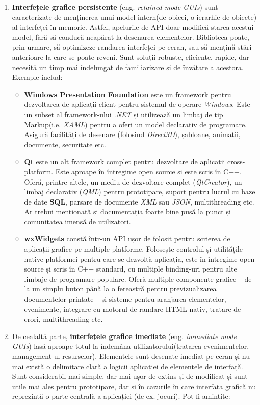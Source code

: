 \documentclass[12pt,a4paper]{report}
\begin{document}
\begin{enumerate}
	\item \textbf{Interfețele grafice persistente} (eng. \textit{retained mode GUIs}) sunt caracterizate de menținerea unui model intern(de obicei, o ierarhie de obiecte) al interfeței în memorie. Astfel, apelurile de API doar modifică starea acestui model, fără să conducă neapărat la desenarea elementelor. Biblioteca poate, prin urmare, să optimizeze randarea interfeței pe ecran, sau să mențină stări anterioare la care se poate reveni. Sunt soluții robuste, eficiente, rapide, dar necesită un timp mai îndelungat de familiarizare și de învățare a acestora. Exemple includ:
	\begin{itemize}
		\item \textbf{Windows Presentation Foundation}\cite{wpf} este un framework pentru dezvoltarea de aplicații client pentru sistemul de operare \textit{Windows}. Este un subset al framework-ului \textit{.NET} și utilizează un limbaj de tip Markup(i.e. \textit{XAML}) pentru a oferi un model declarativ de programare. Asigură facilități de desenare (folosind \textit{Direct3D}), șabloane, animații, documente, securitate etc.
		\item \textbf{Qt}\cite{qt} este un alt framework complet pentru dezvoltare de aplicații cross-platform. Este aproape în întregime open source și este scris în C++. Oferă, printre altele, un mediu de dezvoltare complet (\textit{QtCreator}), un limbaj declarativ (\textit{QML}) pentru prototipare, suport pentru lucrul cu baze de date \textbf{SQL}, parsare de documente \textit{XML} sau \textit{JSON}, multithreading etc. Ar trebui menționată și documentația foarte bine pusă la punct și comunitatea imensă de utilizatori.
		\item \textbf{wxWidgets}\cite{wxwidgets} constă într-un API ușor de folosit pentru scrierea de aplicații grafice pe multiple platforme. Folosește controlul și utilitățile native platformei pentru care se dezvoltă aplicația, este în întregime open source și scris în C++ standard, cu multiple binding-uri pentru alte limbaje de programare populare. Oferă multiple componente grafice -- de la un simplu buton până la o fereastră pentru previzualizarea documentelor printate -- și sisteme pentru aranjarea elementelor, evenimente, integrare cu motorul de randare HTML nativ, tratare de erori, multithreading etc.
	\end{itemize} 
	\item De cealaltă parte, \textbf{interfețele grafice imediate} (eng. \textit{immediate mode GUIs}) lasă aproape totul la îndemâna utilizatorului(tratarea evenimentelor, management-ul resurselor). Elementele sunt desenate imediat pe ecran și nu mai există o delimitare clară a logicii aplicației de elementele de interfață. Sunt considerabil mai simple, dar mai ușor de extins și de modificat și sunt utile mai ales pentru prototipare, dar și în cazurile în care interfața grafică nu reprezintă o parte centrală a aplicației (de ex. jocuri). Pot fi amintite:

\end{enumerate}
\end{document}
